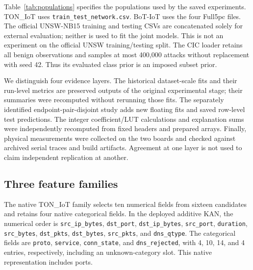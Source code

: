 \documentclass{ieeeaccess}
\begin{document}
Table~\ref{tab:populations} specifies the populations used by the saved experiments. TON\_IoT uses \texttt{train\_test\_network.csv}. BoT-IoT uses the four Full5pc files. The official UNSW-NB15 training and testing CSVs are concatenated solely for external evaluation; neither is used to fit the joint models. This is not an experiment on the official UNSW training/testing split. The CIC loader retains all benign observations and samples at most 400,000 attacks without replacement with seed 42. Thus its evaluated class prior is an imposed subset prior.

We distinguish four evidence layers. The historical dataset-scale fits and their run-level metrics are preserved outputs of the original experimental stage; their summaries were recomputed without rerunning those fits. The separately identified endpoint-pair-disjoint study adds new floating fits and saved row-level test predictions. The integer coefficient/LUT calculations and explanation sums were independently recomputed from fixed headers and prepared arrays. Finally, physical measurements were collected on the two boards and checked against archived serial traces and build artifacts. Agreement at one layer is not used to claim independent replication at another.

\subsection{Three feature families}
\label{sec:features}
The native TON\_IoT family selects ten numerical fields from sixteen candidates and retains four native categorical fields. In the deployed additive KAN, the numerical order is \texttt{src\_ip\_bytes}, \texttt{dst\_port}, \texttt{dst\_ip\_bytes}, \texttt{src\_port}, \texttt{duration}, \texttt{src\_bytes}, \texttt{dst\_pkts}, \texttt{dst\_bytes}, \texttt{src\_pkts}, and \texttt{dns\_qtype}. The categorical fields are \texttt{proto}, \texttt{service}, \texttt{conn\_state}, and \texttt{dns\_rejected}, with 4, 10, 14, and 4 entries, respectively, including an unknown-category slot. This native representation includes ports.
\end{document}
